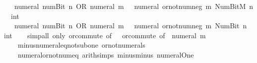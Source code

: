 \begin{isabellebody}
\ \ {\isacartoucheopen}{\isacharminus}{\kern0pt}\ {\isacharparenleft}{\kern0pt}numeral\ {\isacharparenleft}{\kern0pt}num{\isachardot}{\kern0pt}Bit{}\ n{\isacharparenright}{\kern0pt}{\isacharparenright}{\kern0pt}\ OR\ numeral\ m\ {\isacharequal}{\kern0pt}\ {\isacharminus}{\kern0pt}\ {\isacharparenleft}{\kern0pt}numeral\ {\isacharparenleft}{\kern0pt}or{\isacharunderscore}{\kern0pt}not{\isacharunderscore}{\kern0pt}num{\isacharunderscore}{\kern0pt}neg\ m\ {\isacharparenleft}{\kern0pt}Num{\isachardot}{\kern0pt}BitM\ n{\isacharparenright}{\kern0pt}{\isacharparenright}{\kern0pt}\ {\isacharcolon}{\kern0pt}{\isacharcolon}{\kern0pt}\ int{\isacharparenright}{\kern0pt}{\isacartoucheclose}\isanewline
\ \ {\isacartoucheopen}{\isacharminus}{\kern0pt}\ {\isacharparenleft}{\kern0pt}numeral\ {\isacharparenleft}{\kern0pt}num{\isachardot}{\kern0pt}Bit{}\ n{\isacharparenright}{\kern0pt}{\isacharparenright}{\kern0pt}\ OR\ numeral\ m\ {\isacharequal}{\kern0pt}\ {\isacharminus}{\kern0pt}\ {\isacharparenleft}{\kern0pt}numeral\ {\isacharparenleft}{\kern0pt}or{\isacharunderscore}{\kern0pt}not{\isacharunderscore}{\kern0pt}num{\isacharunderscore}{\kern0pt}neg\ m\ {\isacharparenleft}{\kern0pt}Num{\isachardot}{\kern0pt}Bit{}\ n{\isacharparenright}{\kern0pt}{\isacharparenright}{\kern0pt}\ {\isacharcolon}{\kern0pt}{\isacharcolon}{\kern0pt}\ int{\isacharparenright}{\kern0pt}{\isacartoucheclose}\isanewline
%
\isadelimproof
\ \ %
\endisadelimproof
%
\isatagproof
{}\isamarkupfalse%
\ {\isacharparenleft}{\kern0pt}simp{\isacharunderscore}{\kern0pt}all\ only{\isacharcolon}{\kern0pt}\ or{\isachardot}{\kern0pt}commute\ {\isacharbrackleft}{\kern0pt}of\ {\isacharunderscore}{\kern0pt}\ {}{\isacharbrackright}{\kern0pt}\ or{\isachardot}{\kern0pt}commute\ {\isacharbrackleft}{\kern0pt}of\ {\isacharunderscore}{\kern0pt}\ {\isacartoucheopen}numeral\ m{\isacartoucheclose}{\isacharbrackright}{\kern0pt}\isanewline
\ \ \ \ minus{\isacharunderscore}{\kern0pt}numeral{\isacharunderscore}{\kern0pt}eq{\isacharunderscore}{\kern0pt}not{\isacharunderscore}{\kern0pt}sub{\isacharunderscore}{\kern0pt}one\ or{\isacharunderscore}{\kern0pt}not{\isacharunderscore}{\kern0pt}numerals\isanewline
\ \ \ \ numeral{\isacharunderscore}{\kern0pt}or{\isacharunderscore}{\kern0pt}not{\isacharunderscore}{\kern0pt}num{\isacharunderscore}{\kern0pt}eq\ arith{\isacharunderscore}{\kern0pt}simps\ minus{\isacharunderscore}{\kern0pt}minus\ numeral{\isacharunderscore}{\kern0pt}One{\isacharparenright}{\kern0pt}%
\endisatagproof
{\isafoldproof}%
%
\isadelimproof
\isanewline
%
\endisadelimproof

\end{isabellebody}
